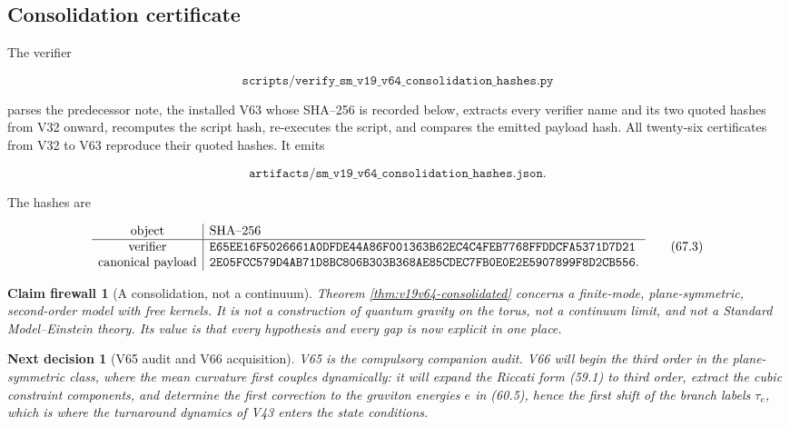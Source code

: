 \documentclass[11pt]{article}
\newtheorem{firewall}[theorem]{Claim firewall}
\newtheorem{decision}[theorem]{Next decision}
\theoremstyle{remark}
\begin{document}
\subsection{Consolidation certificate}

The verifier

\[
 \texttt{scripts/verify\_sm\_v19\_v64\_consolidation\_hashes.py}    \tag{67.1}
\]

parses the predecessor note, the installed V63 whose SHA--256 is
recorded below, extracts every verifier name and its two quoted
hashes from V32 onward, recomputes the script hash, re-executes the
script, and compares the emitted payload hash.  All twenty-six
certificates from V32 to V63 reproduce their quoted hashes.  It emits

\[
 \texttt{artifacts/sm\_v19\_v64\_consolidation\_hashes.json}.       \tag{67.2}
\]

The hashes are

\[
\begin{array}{c|l}
\hbox{object}&\hbox{SHA--256}\\ \hline
\hbox{verifier}&
\texttt{E65EE16F5026661A0DFDE44A86F001363B62EC4C4FEB7768FFDDCFA5371D7D21}\\
\hbox{canonical payload}&
\texttt{2E05FCC579D4AB71D8BC806B303B368AE85CDEC7FB0E0E2E5907899F8D2CB556}.
\end{array}                                                     \tag{67.3}
\]

\begin{firewall}[A consolidation, not a continuum]
\label{fire:v19v64}
Theorem \ref{thm:v19v64-consolidated} concerns a finite-mode,
plane-symmetric, second-order model with free kernels.  It is not a
construction of quantum gravity on the torus, not a continuum limit,
and not a Standard Model--Einstein theory.  Its value is that every
hypothesis and every gap is now explicit in one place.
\end{firewall}

\begin{decision}[V65 audit and V66 acquisition]
\label{dec:v19v64-next}
V65 is the compulsory companion audit.  V66 will begin the third
order in the plane-symmetric class, where the mean curvature first
couples dynamically: it will expand the Riccati form (59.1) to third
order, extract the cubic constraint components, and determine the
first correction to the graviton energies \(e\) in (60.5), hence the
first shift of the branch labels \(\tau_e\), which is where the
turnaround dynamics of V43 enters the state conditions.
\end{decision}
\end{document}
